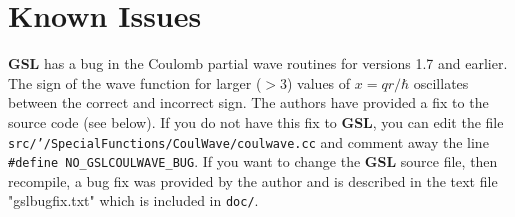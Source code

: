 \documentclass[10pt]{article}
\begin{document}
\section{Known Issues}

{\bf GSL} has a bug in the Coulomb partial wave routines for versions 1.7 and earlier. The sign of the wave function for larger ($>$3) values of $x=qr/\hbar$ oscillates between the correct and incorrect sign. The authors have provided a fix to the source code (see below). If you do not have this fix to {\bf GSL}, you can edit the file {\tt src/'/SpecialFunctions/CoulWave/coulwave.cc} and comment away the line {\tt \#define NO\_GSLCOULWAVE\_BUG}. If you want to change the {\bf GSL} source file, then recompile, a bug fix was provided by the author and is described in the text file "gslbugfix.txt" which is included in  {\tt doc/}.
\end{document}
